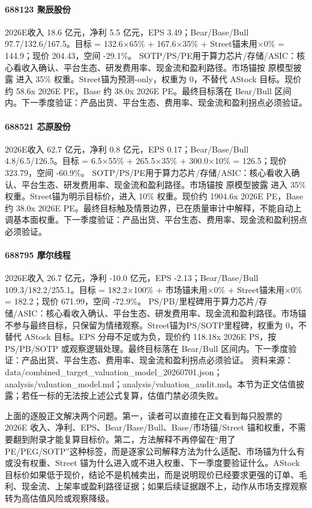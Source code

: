 \paragraph{688123 聚辰股份} 2026E收入 18.6 亿元，净利 5.5 亿元，EPS 3.49；Bear/Base/Bull 97.7/132.6/167.5。目标 = 132.6×65\% + 167.6×35\% + Street锚未用×0\% = 144.9；现价 204.43，空间 -29.1\%。 SOTP/PS/PE用于算力芯片/存储/ASIC：核心看收入确认、平台生态、研发费用率、现金流和盈利路径。市场锚按 原模型披露 进入 35\% 权重。Street锚为预测-only，权重为 0，不替代 AStock 目标。现价约 58.6x 2026E PE，Base 约 38.0x 2026E PE。最终目标落在 Bear/Bull 区间内。下一季度验证：产品出货、平台生态、费用率、现金流和盈利拐点必须验证。
\paragraph{688521 芯原股份} 2026E收入 62.7 亿元，净利 0.8 亿元，EPS 0.17；Bear/Base/Bull 4.8/6.5/126.5。目标 = 6.5×55\% + 265.5×35\% + 300.0×10\% = 126.5；现价 323.79，空间 -60.9\%。 SOTP/PS/PE用于算力芯片/存储/ASIC：核心看收入确认、平台生态、研发费用率、现金流和盈利路径。市场锚按 原模型披露 进入 35\% 权重。Street锚为明示目标价，进入 10\% 权重。现价约 1904.6x 2026E PE，Base 约 38.0x 2026E PE。最终目标触及情景边界，已在质量审计中解释，不能自动上调基本面权重。下一季度验证：产品出货、平台生态、费用率、现金流和盈利拐点必须验证。
\paragraph{688795 摩尔线程} 2026E收入 26.7 亿元，净利 -10.0 亿元，EPS -2.13；Bear/Base/Bull 109.3/182.2/255.1。目标 = 182.2×100\% + 市场锚未用×0\% + Street锚未用×0\% = 182.2；现价 671.99，空间 -72.9\%。 PS/PB/里程碑用于算力芯片/存储/ASIC：核心看收入确认、平台生态、研发费用率、现金流和盈利路径。市场锚不参与最终目标，只保留为情绪观察。Street锚为PS/SOTP里程碑，权重为 0，不替代 AStock 目标。EPS 分母不足或为负，现价约 118.18x 2026E PS，按 PS/PB/SOTP 或观察逻辑处理。最终目标落在 Bear/Bull 区间内。下一季度验证：产品出货、平台生态、费用率、现金流和盈利拐点必须验证。
{\footnotesize 资料来源：data/combined\_target\_valuation\_model\_20260701.json；analysis/valuation\_model.md；analysis/valuation\_audit.md。本节为正文估值披露；若任一标的无法按上述公式复算，估值门禁必须失败。}

上面的逐股正文解决两个问题。第一，读者可以直接在正文看到每只股票的 2026E 收入、净利、EPS、Bear/Base/Bull、Base/市场锚/Street 锚和权重，不需要翻到附录才能复算目标价。第二，方法解释不再停留在“用了 PE/PEG/SOTP”这种标签，而是逐家公司解释方法为什么适配、市场锚为什么有或没有权重、Street 锚为什么进入或不进入权重、下一季度要验证什么。AStock 目标价如果低于现价，结论不是机械卖出，而是说明现价已经要求更强的订单、毛利、现金流、上架率或盈利路径证据；如果后续证据跟不上，动作从市场支撑观察转为高估值风险或观察降级。

